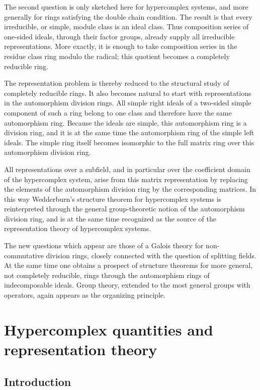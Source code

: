 \documentclass[
  12pt,
]{article}
\begin{document}
The second question is only sketched here for hypercomplex systems, and
more generally for rings satisfying the double chain condition. The
result is that every irreducible, or simple, module class is an ideal
class. Thus composition series of one-sided ideals, through their factor
groups, already supply all irreducible representations. More exactly, it
is enough to take composition series in the residue class ring modulo
the radical; this quotient becomes a completely reducible ring.

The representation problem is thereby reduced to the structural study of
completely reducible rings. It also becomes natural to start with
representations in the automorphism division rings. All simple right
ideals of a two-sided simple component of such a ring belong to one
class and therefore have the same automorphism ring. Because the ideals
are simple, this automorphism ring is a division ring, and it is at the
same time the automorphism ring of the simple left ideals. The simple
ring itself becomes isomorphic to the full matrix ring over this
automorphism division ring.

All representations over a subfield, and in particular over the
coefficient domain of the hypercomplex system, arise from this matrix
representation by replacing the elements of the automorphism division
ring by the corresponding matrices. In this way Wedderburn's structure
theorem for hypercomplex systems is reinterpreted through the general
group-theoretic notion of the automorphism division ring, and is at the
same time recognized as the source of the representation theory of
hypercomplex systems.

The new questions which appear are those of a Galois theory for
non-commutative division rings, closely connected with the question of
splitting fields. At the same time one obtains a prospect of structure
theorems for more general, not completely reducible, rings through the
automorphism rings of indecomposable ideals. Group theory, extended to
the most general groups with operators, again appears as the organizing
principle.

\section{Hypercomplex quantities and representation
theory}\label{hypercomplex-quantities-and-representation-theory}

\subsection{Introduction}\label{introduction-1}
\end{document}
